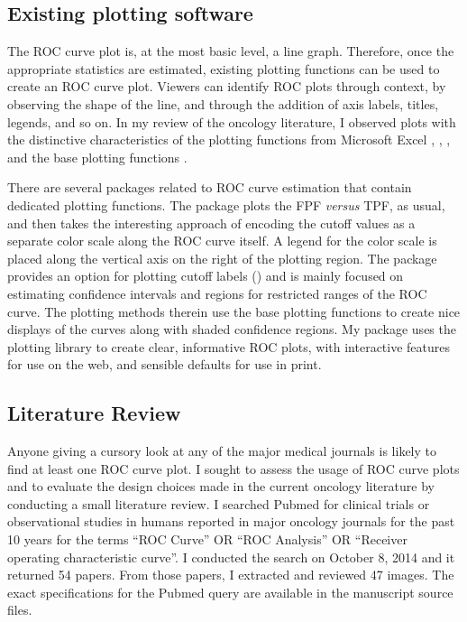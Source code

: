\documentclass[codesnippet]{jss}
\begin{document}
\subsection{Existing plotting
software}\label{existing-plotting-software}

The ROC curve plot is, at the most basic level, a line graph. Therefore,
once the appropriate statistics are estimated, existing plotting
functions can be used to create an ROC curve plot. Viewers can identify
ROC plots through context, by observing the shape of the line, and
through the addition of axis labels, titles, legends, and so on. In my
review of the oncology literature, I observed plots with the distinctive
characteristics of the plotting functions from Microsoft Excel
\citep{excel},  \citep{sas},  \citep{spss},
and the base  plotting functions \citep{arr}.

There are several  packages related to ROC curve estimation
that contain dedicated plotting functions. The  package
\citep{rocr} plots the FPF \emph{versus} TPF, as usual, and then takes
the interesting approach of encoding the cutoff values as a separate
color scale along the ROC curve itself. A legend for the color scale is
placed along the vertical axis on the right of the plotting region. The
 package \citep{pROC} provides an option for plotting cutoff
labels () and is mainly focused on estimating
confidence intervals and regions for restricted ranges of the ROC curve.
The plotting methods therein use the base  plotting
functions to create nice displays of the curves along with shaded
confidence regions. My  package uses the 
\citep{ggplot2} plotting library to create clear, informative ROC plots,
with interactive features for use on the web, and sensible defaults for
use in print.

\subsection{Literature Review}\label{literature-review}

Anyone giving a cursory look at any of the major medical journals is
likely to find at least one ROC curve plot. I sought to assess the usage
of ROC curve plots and to evaluate the design choices made in the
current oncology literature by conducting a small literature review. I
searched Pubmed for clinical trials or observational studies in humans
reported in major oncology journals for the past 10 years for the terms
``ROC Curve'' OR ``ROC Analysis'' OR ``Receiver operating characteristic
curve''. I conducted the search on October 8, 2014 and it returned 54
papers. From those papers, I extracted and reviewed 47 images. The exact
specifications for the Pubmed query are available in the manuscript
source files.
\end{document}
